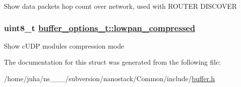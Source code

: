 Show data packets hop count over network, used with ROUTER DISCOVER \hypertarget{structbuffer__options__t_4ee6fc95c4cf1f37cf59c66a3f7984e5}{
\subsubsection[lowpan\_\-compressed]{\setlength{\rightskip}{0pt plus 5cm}uint8\_\-t \hyperlink{structbuffer__options__t_4ee6fc95c4cf1f37cf59c66a3f7984e5}{buffer\_\-options\_\-t::lowpan\_\-compressed}}}
\label{structbuffer__options__t_4ee6fc95c4cf1f37cf59c66a3f7984e5}


Show c\-UDP modules compression mode 

The documentation for this struct was generated from the following file:\begin{CompactItemize}
\item 
/home/juha/ns\_\_\_/subversion/nanostack/Common/include/\hyperlink{buffer_8h}{buffer.h}\end{CompactItemize}

